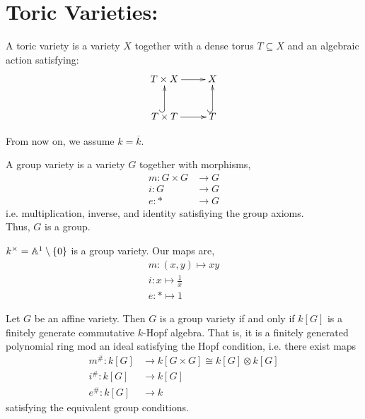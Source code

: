 \documentclass[12pt]{amsart}
\begin{document}
\section{Toric Varieties:}

\begin{definition}
    A toric variety is a variety $X$ together with a dense torus $T \subseteq X$ and an algebraic action satisfying: 
    \[ \xymatrix{ T \times X  \ar[r] & X \\ T\times T \ar@{^{(}->}[u] \ar[r] & T \ar@{^{(}->}[u] }\]    
\end{definition}

From now on, we assume $k = \overline{k}$. 

\begin{definition}
    A group variety is a variety $G$ together with morphisms, 
    \begin{align*}
        m: G \times G &\to G \\
        i: G &\to G \\
        e: * &\to G 
    \end{align*}
    i.e. multiplication, inverse, and identity satisfiying the group axioms. \\
    Thus, $G$ is a group. 
\end{definition}

\begin{example}
    $k^\times = \mathbb A^1 \setminus \{0\}$ is a group variety. Our maps are, 
    \begin{align*}
        m: (x,y) \mapsto xy \\
        i: x \mapsto \frac{1}{x} \\
        e: * \mapsto 1
    \end{align*}
\end{example}

\begin{proposition}
    Let $G$ be an affine variety. Then $G$ is a group variety if and only if $k[G]$ is a finitely generate commutative $k$-Hopf algebra. That is, it is a finitely generated polynomial ring mod an ideal satisfying the Hopf condition, i.e. there exist maps 
    \begin{align*}
        m^\#: k[G] &\to k[G\times G] \cong k[G] \otimes k[G] \\
        i^\#: k[G] &\to k[G] \\
        e^\#: k[G] &\to k
    \end{align*}
    satisfying the equivalent group conditions. 
\end{proposition}
\end{document}
